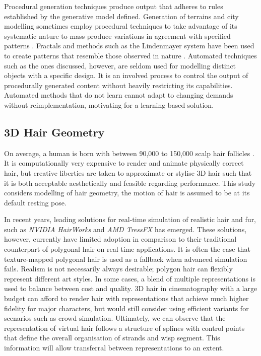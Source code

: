 \documentclass[ %
author={Dillon Keith Diep},
supervisor={Dr. Carl Henrik Ek},
degree={MEng},
title={ART-CG Hair:},
subtitle={Assisted Real-time Content Generation of Stylised Virtual Hair},
type={Research},
year={2017} ]{dissertation}
\begin{document}
Procedural generation techniques produce output that adheres to rules established by the generative model defined. Generation of terrains and city modelling sometimes employ procedural techniques to take advantage of its systematic nature to mass produce variations in agreement with specified patterns \cite{procedural1}. Fractals and methods such as the Lindenmayer system have been used to create patterns that resemble those observed in nature \cite{lsystem}. Automated techniques such as the ones discussed, however, are seldom used for modelling distinct objects with a specific design. It is an involved process to control the output of procedurally generated content without heavily restricting its capabilities. Automated methods that do not learn cannot adapt to changing demands without reimplementation, motivating for a learning-based solution.

\subsection{3D Hair Geometry}
On average, a human is born with between 90,000 to 150,000 scalp hair follicles \cite{hairfollicles}. It is computationally very expensive to render and animate physically correct hair, but creative liberties are taken to approximate or stylise 3D hair such that it is both acceptable aesthetically and feasible regarding performance. This study considers modelling of hair geometry, the motion of hair is assumed to be at its default resting pose.

In recent years, leading solutions for real-time simulation of realistic hair and fur, such as \textit{NVIDIA HairWorks} and \textit{AMD TressFX} has emerged. These solutions, however, currently have limited adoption in comparison to their traditional counterpart of polygonal hair on real-time applications. It is often the case that texture-mapped polygonal hair is used as a fallback when advanced simulation fails. Realism is not necessarily always desirable; polygon hair can flexibly represent different art styles. In some cases, a blend of multiple representations is used to balance between cost and quality. 3D hair in cinematography with a large budget can afford to render hair with representations that achieve much higher fidelity for major characters, but would still consider using efficient variants for scenarios such as crowd simulation. Ultimately, we can observe that the representation of virtual hair follows a structure of splines with control points that define the overall organisation of strands and wisp segment. This information will allow transferral between representations to an extent.
\end{document}
